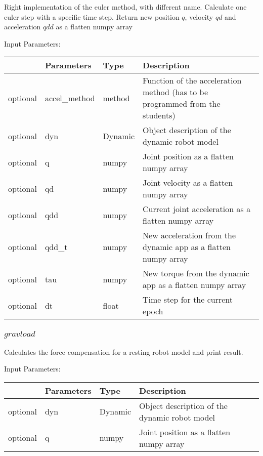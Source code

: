 \documentclass[
	ngerman,
	accentcolor=9c,%
	type=intern,
	marginpar=false
	]{tudapub}
\begin{document}
\noindent Right implementation of the euler method, with different name. Calculate one euler step with a specific time step. Return new position $q$, velocity $qd$ and acceleration $qdd$ as a flatten numpy array

\vspace{0.5cm}
\noindent Input Parameters:
\vspace{0.5cm}

\begin{tabular}{|p{}|p{}|p{}| p{}|}
\hline
 & \textbf{Parameters} & \textbf{Type} & \textbf{Description} \\
\hline
optional & accel\_method & method & Function of the acceleration method (has to be programmed from the students) \\
\hline
optional & dyn & Dynamic & Object description of the dynamic robot model \\
\hline
optional & q & numpy & Joint position as a flatten numpy array \\
\hline
optional & qd & numpy & Joint velocity as a flatten numpy array \\
\hline
optional & qdd & numpy & Current joint acceleration as a flatten numpy array \\
\hline
optional & qdd\_t & numpy & New acceleration from the dynamic app as a flatten numpy array \\
\hline
optional & tau & numpy & New torque from the dynamic app as a flatten numpy array\\
\hline
optional & dt & float & Time step for the current epoch \\
\hline
\end{tabular}


\vspace{0.5cm}
\subsubsection{$gravload$}
\noindent Calculates the force compensation for a resting robot model and print result.

\vspace{0.5cm}
\noindent Input Parameters:
\vspace{0.5cm}

\begin{tabular}{|p{}|p{}|p{}| p{}|}
\hline
 & \textbf{Parameters} & \textbf{Type} & \textbf{Description} \\
\hline
optional & dyn & Dynamic & Object description of the dynamic robot model \\
\hline
optional & q & numpy & Joint position as a flatten numpy array \\
\hline
\end{tabular}
\end{document}
